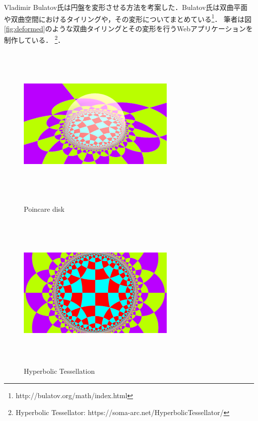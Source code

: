 Vladimir Bulatov氏は円盤を変形させる方法を考案した\cite{bending}．Bulatov氏は双曲平面や双曲空間におけるタイリングや，その変形についてまとめている\footnote{http://bulatov.org/math/index.html}．
筆者は図\ref{fig:deformed}のような双曲タイリングとその変形を行うWebアプリケーションを制作している．
\footnote{Hyperbolic Tessellator: https://soma-arc.net/HyperbolicTessellator/}．


\begin{figure}[h!tbp]
 \begin{minipage}{0.49\hsize}
   \begin{center}
    \includegraphics[width=3in, height=3in, keepaspectratio]{../img/tessellation/poincare.pdf}
    \caption{Poincare disk}
    \label{fig:poincare}
   \end{center}
 \end{minipage}
 \hspace*{\fill}
 \begin{minipage}{0.49\hsize}
   \begin{center}
    \includegraphics[width=3in, height=3in, keepaspectratio]{../img/tessellation/outer.pdf}
    \caption{Hyperbolic Tessellation}
    \label{fig:outer}
   \end{center}
 \end{minipage}
\end{figure}


